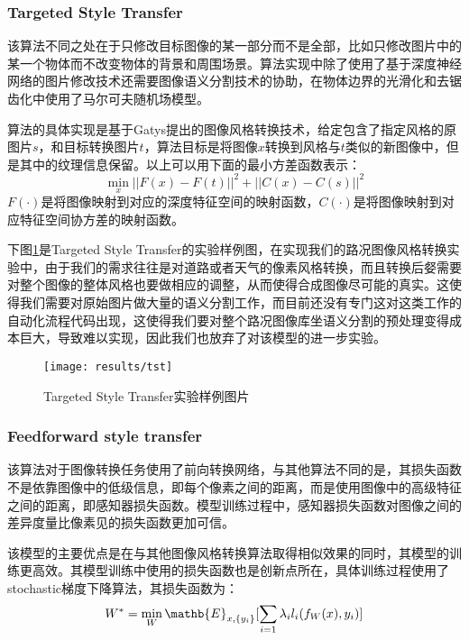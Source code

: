 \subsubsection{Targeted Style Transfer}

 该算法不同之处在于只修改目标图像的某一部分而不是全部，比如只修改图片中的某一个物体而不改变物体的背景和周围场景。算法实现中除了使用了基于深度神经网络的图片修改技术还需要图像语义分割技术的协助，在物体边界的光滑化和去锯齿化中使用了马尔可夫随机场模型。

算法的具体实现是基于Gatys提出的图像风格转换技术\cite{nst}，给定包含了指定风格的原图片$s$，和目标转换图片$t$，算法目标是将图像$x$转换到风格与$t$类似的新图像中，但是其中的纹理信息保留。以上可以用下面的最小方差函数表示：
$$\min_x ||F(x)-F(t)||^2+||C(x)-C(s)||^2$$
$F(\cdot)$是将图像映射到对应的深度特征空间的映射函数，$C(\cdot)$是将图像映射到对应特征空间协方差的映射函数。

下图\ref{fig:tst}是Targeted Style Transfer的实验样例图，在实现我们的路况图像风格转换实验中，由于我们的需求往往是对道路或者天气的像素风格转换，而且转换后㛑需要对整个图像的整体风格也要做相应的调整，从而使得合成图像尽可能的真实。这使得我们需要对原始图片做大量的语义分割工作，而目前还没有专门这对这类工作的自动化流程代码出现，这使得我们要对整个路况图像库坐语义分割的预处理变得成本巨大，导致难以实现，因此我们也放弃了对该模型的进一步实验。

\begin{figure}[h]
    \centering
    \texttt{[image: results/tst]}
    \caption{Targeted Style Transfer实验样例图片}
    \label{fig:tst}
\end{figure}

\subsubsection{Feedforward style transfer}

 该算法对于图像转换任务使用了前向转换网络，与其他算法不同的是，其损失函数不是依靠图像中的低级信息，即每个像素之间的距离，而是使用图像中的高级特征之间的距离，即感知器损失函数。模型训练过程中，感知器损失函数对图像之间的差异度量比像素见的损失函数更加可信。

该模型的主要优点是在与其他图像风格转换算法取得相似效果的同时，其模型的训练更高效。其模型训练中使用的损失函数也是创新点所在，具体训练过程使用了stochastic梯度下降算法，其损失函数为：
$$W^*=\min_W\mathb{E}_{x,\{y_i\}}[\sum_{i=1}\lambda_il_i(f_W(x),y_i)]$$


